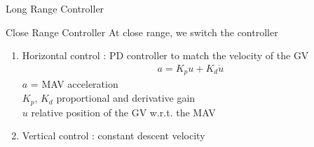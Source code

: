 \begin{frame}{Long Range Controller}
\begin{frame}{Close Range Controller}
	At close range, we switch the controller
	\begin{enumerate}
		\item Horizontal control : PD controller to match the velocity of the GV
	\begin{align*}
		a = K_p u + K_d \dot{u}
	\end{align*}
	$a$ = MAV acceleration \\
	$K_p$, $K_d$ proportional and derivative gain \\
	$u$ relative position of the GV w.r.t. the MAV
		\item Vertical control : constant descent velocity
	\end{enumerate} 
\end{frame}



\end{frame}
